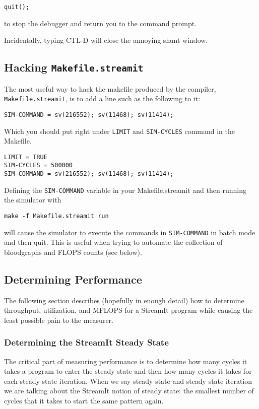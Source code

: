\documentclass{article}
\begin{document}
\begin{verbatim}quit();\end{verbatim}

to stop the debugger and return you to the command prompt.

Incidentally, typing CTL-D will close the annoying shunt window.

\subsection{Hacking \texttt{Makefile.streamit}}
The most useful way to hack the makefile produced by the compiler,
\texttt{Makefile.streamit}, is to add a line such as the following to it:

\begin{verbatim}SIM-COMMAND = sv(216552); sv(11468); sv(11414);\end{verbatim}

Which you should put right under \texttt{LIMIT} and \texttt{SIM-CYCLES}
command in the Makefile.
\begin{verbatim}
LIMIT = TRUE
SIM-CYCLES = 500000
SIM-COMMAND = sv(216552); sv(11468); sv(11414); 
\end{verbatim}

Defining the \texttt{SIM-COMMAND} variable in your Makefile.streamit and 
then running the simulator with 

\begin{verbatim}make -f Makefile.streamit run\end{verbatim}

will cause the simulator to execute the commands in \texttt{SIM-COMMAND}
in batch mode and then quit. This is useful when trying to automate
the collection of bloodgraphs and FLOPS counts (see below).






\subsection{Determining Performance}
The following section describes (hopefully in enough detail) how
to determine throughput, utilization, and MFLOPS for a StreamIt program
while causing the least possible pain to the measurer.

\subsubsection{Determining the StreamIt Steady State}
The critical part of measuring performance is to determine how many cycles
it takes a program to enter the steady state and then how many cycles
it takes for each steady state iteration. When we say steady state and steady
state iteration we are talking about the StreamIt notion of steady state: the
smallest number of cycles that it takes to start the same pattern again.
\end{document}
